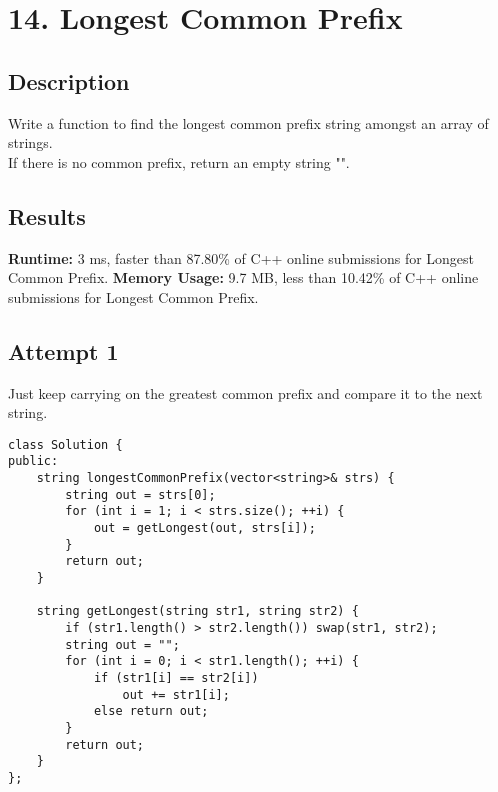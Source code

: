 \chapter{14. Longest Common Prefix}
\section{Description}
Write a function to find the longest common prefix string amongst an array of strings.
\\
If there is no common prefix, return an empty string "".
\section{Results}
\textbf{Runtime:}
3 ms, faster than 87.80\% of C++ online submissions for Longest Common Prefix.
\textbf{Memory Usage:}
9.7 MB, less than 10.42\% of C++ online submissions for Longest Common Prefix.
\newpage
\section{Attempt 1}
Just keep carrying on the greatest common prefix and compare it to the next string.
\begin{lstlisting}
class Solution {
public:
    string longestCommonPrefix(vector<string>& strs) {
        string out = strs[0];
        for (int i = 1; i < strs.size(); ++i) {
            out = getLongest(out, strs[i]);
        }
        return out;
    }
    
    string getLongest(string str1, string str2) {
        if (str1.length() > str2.length()) swap(str1, str2);
        string out = "";
        for (int i = 0; i < str1.length(); ++i) {
            if (str1[i] == str2[i])
                out += str1[i];
            else return out;
        }
        return out;
    }
};
\end{lstlisting}
